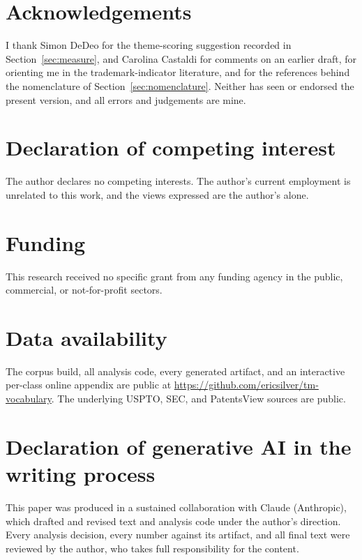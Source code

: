 \section*{Acknowledgements}
I thank Simon DeDeo for the theme-scoring suggestion recorded in
Section~\ref{sec:measure}, and Carolina Castaldi for comments on an
earlier draft, for orienting me in the trademark-indicator literature,
and for the references behind the nomenclature of
Section~\ref{sec:nomenclature}. Neither has seen or endorsed the present
version, and all errors and judgements are mine.

\section*{Declaration of competing interest}
The author declares no competing interests. The author's current
employment is unrelated to this work, and the views expressed are the
author's alone.

\section*{Funding}
This research received no specific grant from any funding agency in the
public, commercial, or not-for-profit sectors.

\section*{Data availability}
The corpus build, all analysis code, every generated artifact, and an
interactive per-class online appendix are public at
\url{https://github.com/ericsilver/tm-vocabulary}. The underlying USPTO,
SEC, and PatentsView sources are public.

\section*{Declaration of generative AI in the writing process}
This paper was produced in a sustained collaboration with Claude
(Anthropic), which drafted and revised text and analysis code under the
author's direction. Every analysis decision, every number against its
artifact, and all final text were reviewed by the author, who takes full
responsibility for the content.
